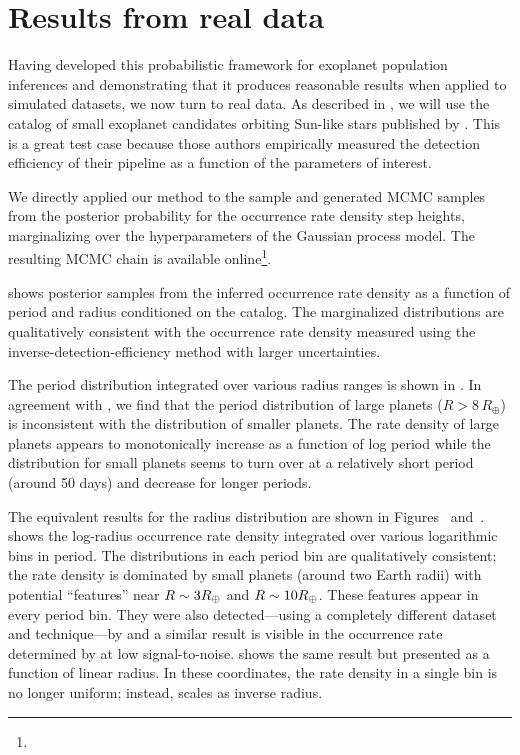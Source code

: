 \section{Results from real data}

Having developed this probabilistic framework for exoplanet population
inferences and demonstrating that it produces reasonable results when applied
to simulated datasets, we now turn to real data.
As described in , we will use the catalog of small exoplanet
candidates orbiting Sun-like stars published by \citet{Petigura:2013}.
This is a great test case because those authors empirically measured the
detection efficiency of their pipeline as a function of the parameters of
interest.

We directly applied our method to the \citet{Petigura:2013} sample and generated
MCMC samples from the posterior probability for the occurrence rate density
step heights, marginalizing over the hyperparameters of the Gaussian process
model.
The resulting MCMC chain is available online\footnote{\resultsurl}.

 shows posterior samples from the inferred occurrence rate
density as a function of period and radius conditioned on the catalog.
The marginalized distributions are qualitatively consistent with the
occurrence rate density measured using the inverse-detection-efficiency
method with larger uncertainties.

The period distribution integrated over various radius ranges is shown in
.
In agreement with \citet{Dong:2013}, we find that the period distribution of large
planets ($R > 8\,R_\oplus$) is inconsistent with the distribution of smaller
planets.
The rate density of large planets appears to monotonically increase as a
function of log period while the distribution for small planets seems to turn
over at a relatively short period (around 50 days) and decrease for longer
periods.

The equivalent results for the radius distribution are shown in
Figures~ and~.
 shows the log-radius occurrence rate density integrated over
various logarithmic bins in period.
The distributions in each period bin are qualitatively consistent; the
rate density is dominated by small planets (around two Earth radii) with
potential ``features'' near $R\sim3R_\oplus$ and $R\sim
10R_\oplus$.
These features appear in every period bin.
They were also detected---using a completely different dataset and
technique---by \citet{Dong:2013} and a similar result is visible in the occurrence
rate determined by \citet[][their Figure 7]{Fressin:2013} at low
signal-to-noise.
 shows the same result but presented as a function of
linear radius.
In these coordinates, the rate density in a single bin is no longer
uniform; instead, scales as inverse radius.

